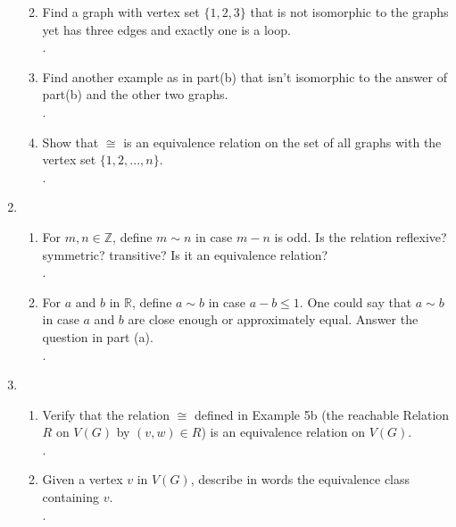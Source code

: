 \documentclass[11pt]{article}
\newcommand{\R}{\mathbb{R}}
\newcommand{\Z}{\mathbb{Z}}
\begin{document}
\begin{enumerate}
\begin{enumerate}
	\item Find a graph with vertex set $\{1,2,3\}$ that is not isomorphic to the graphs yet has three edges and exactly one is 
	a loop.\\
	.
	\item Find another example as in part(b) that isn't isomorphic to the answer of part(b) and the other two graphs.\\
	.
	\item Show that $\cong$ is an equivalence relation on the set of all graphs with the vertex set $\{1,2,...,n\}$.\\
	.
	\end{enumerate}
\setcounter{enumi}{7}
\item
	\begin{enumerate}
	\item For $m,n\in\Z$, define $m\sim n$ in case $m-n$ is odd. Is the relation reflexive? symmetric? transitive? Is it an 
	equivalence relation?\\
	.
	\item For $a$ and $b$ in $\R$, define $a\sim b$ in case $a-b\leq 1$. One could say that $a\sim b$ in case $a$ and $b$ are 
	close enough or approximately equal. Answer the question in part (a).\\
	.
	\end{enumerate}
\setcounter{enumi}{16}
\item 
	\begin{enumerate}
	\item Verify that the relation $\cong$ defined in Example 5b (the reachable Relation $R$ on $V(G)$ by $(v,w)\in R$) is an 
	equivalence relation on $V(G)$.\\
	.
	\item Given a vertex $v$ in $V(G)$, describe in words the equivalence class containing $v$.\\
	.
	\end{enumerate}
\end{enumerate}

\end{document}

